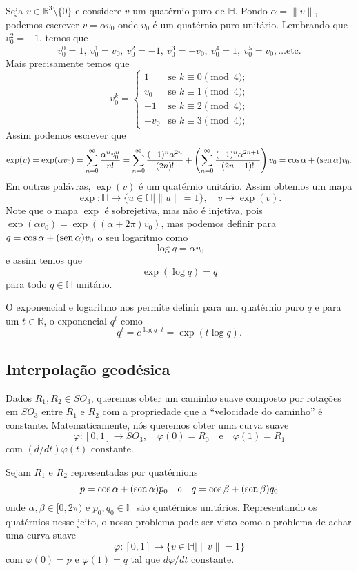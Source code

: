 \documentclass[12pt]{amsart}
\newcommand{\Ha}{\mathbb H}
\newcommand{\R}{\mathbb R}
\DeclareMathOperator{\sen}{\textrm{\rm sen}}
\theoremstyle{definition}
\begin{document}
Seja $v\in\R^3\setminus\{0\}$ e considere $v$ um quatérnio puro de $\Ha$. Pondo $\alpha=\|v\|$, podemos escrever $v=\alpha v_0$ onde $v_0$ é um quatérnio puro unitário. Lembrando que $v_0^2=-1$, temos que 
\[
    v_0^0=1,\  v_0^1=v_0,\ v_0^2=-1,\ v_0^3=-v_0,\ v_0^4=1,\ v_0^5=v_0,\ldots \mbox{etc.}
\]
Mais precisamente temos que 
\[
    v_0^k=\left\{\begin{array}{ll}1 & \mbox{se $k\equiv 0\pmod 4$;}\\
                                  v_0 &  \mbox{se $k\equiv 1\pmod 4$;}\\
                                  -1 & \mbox{se $k\equiv 2\pmod 4$;}\\
                                  -v_0 & \mbox{se $k\equiv 3\pmod 4$;}
    \end{array}\right.
\]
Assim podemos escrever que 
\[
    \exp(v)=\exp(\alpha v_0)=\sum_{n=0}^\infty \frac{\alpha^nv_0^n}{n!}=
    \sum_{n=0}^\infty \frac{(-1)^n\alpha^{2n}}{(2n)!}+
    \left(\sum_{n=0}^\infty \frac{(-1)^n\alpha^{2n+1}}{(2n+1)!}\right)v_0
    =\cos\alpha+(\sen\alpha) v_0.
\]
Em outras palávras, $\exp(v)$ é um quatérnio unitário. Assim obtemos um mapa 
\[
    \exp:\Ha \to \{u\in\Ha\mid \|u\|=1\},\quad v\mapsto \exp(v).
\]
Note que o mapa $\exp$ é sobrejetiva, mas não é injetiva, pois 
$\exp(\alpha v_0)=\exp((\alpha+2\pi)v_0)$, mas podemos definir 
para $q=\cos\alpha+(\sen\alpha)v_0$ o seu logaritmo como  
\[
    \log q=\alpha v_0
\]
e assim temos que 
\[
    \exp(\log q)=q
\]
para todo $q\in\Ha$ unitário.

O exponencial e logaritmo nos permite definir para um quatérnio puro $q$ e para um $t\in\R$, 
o exponencial $q^t$ como 
\[
    q^t=e^{\log q\cdot t}=\exp(t\log q).
\]

\subsection{Interpolação geodésica}
Dados $R_1,R_2\in SO_3$, queremos obter um caminho suave 
composto por rotações em $SO_3$ 
entre $R_1$ e $R_2$ com a propriedade que a ``velocidade do caminho'' é constante.
Matematicamente, nós queremos obter uma curva suave
\[
    \varphi:[0,1]\to SO_3,\quad \varphi(0)=R_0\quad\mbox{e}\quad \varphi(1)=R_1
\]
com $(d/dt)\varphi(t)$ constante.

Sejam $R_1$ e $R_2$ representadas por quatérnions 
\[
    p=\cos\alpha+(\sen\alpha)p_0\quad\mbox{e}\quad q=\cos\beta+(\sen\beta)q_0
\]
onde $\alpha,\beta\in[0,2\pi)$ e $p_0,q_0\in \Ha$ são quatérnios unitários.
Representando os quatérnios nesse jeito, o nosso problema pode ser visto como o problema de achar 
uma curva suave
\[
    \varphi:[0,1]\to \{v\in\Ha\mid \|v\|=1\}
\]
com $\varphi(0)=p$ e $\varphi(1)=q$ tal que $d\varphi/dt$ constante.
\end{document}
